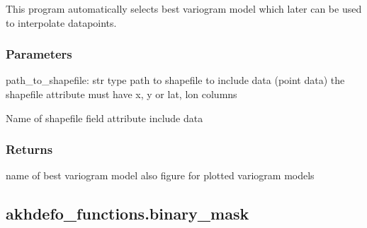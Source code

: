 \documentclass[letterpaper,10pt]{sphinxmanual}
\begin{document}
\begin{fulllineitems}
\label{\detokenize{generated/akhdefo_functions.Auto_Variogram:akhdefo_functions.Auto_Variogram}}
\pysigstartsignatures
{}
\pysigstopsignatures
\sphinxAtStartPar
This program automatically selects best variogram model which later 
can be used to interpolate datapoints.


\subsubsection{Parameters}
\label{\detokenize{generated/akhdefo_functions.Auto_Variogram:parameters}}
\sphinxAtStartPar
path\_to\_shapefile: str 
type path to shapefile to include data (point data)
the shapefile attribute must have x, y or lat, lon columns
\begin{description}
\sphinxAtStartPar
Name of shapefile field attribute include data

\end{description}


\subsubsection{Returns}
\label{\detokenize{generated/akhdefo_functions.Auto_Variogram:returns}}\begin{description}
\sphinxAtStartPar
name of best variogram model
also figure for plotted variogram models

\end{description}

\end{fulllineitems}


\sphinxstepscope


\subsection{akhdefo\_functions.binary\_mask}
\label{\detokenize{generated/akhdefo_functions.binary_mask:akhdefo-functions-binary-mask}}\label{\detokenize{generated/akhdefo_functions.binary_mask::doc}}
\end{document}
